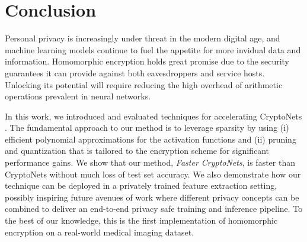 \documentclass[conference]{IEEEtran}
\begin{document}



\section{Conclusion}
Personal privacy is increasingly under threat in the modern digital age, and machine learning models continue to fuel the appetite for more invidual data and information. 
Homomorphic encryption holds great promise due to the security guarantees it can provide against both eavesdroppers and service hosts.
Unlocking its potential will require reducing the high overhead of arithmetic operations prevalent in neural networks.


In this work, we introduced and evaluated techniques for accelerating CryptoNets \cite{gilad2016cryptonets}.
The fundamental approach to our method is to leverage sparsity by using (i) efficient polynomial approximations for the activation functions and (ii) pruning and quantization that is tailored to the encryption scheme for significant performance gains. 
We show that our method, \textit{Faster CryptoNets}, is faster than CryptoNets without much loss of test set accuracy.%
We also demonstrate how our technique can be deployed in a privately trained feature extraction setting, possibly inspiring future avenues of work where different privacy concepts can be combined to deliver an end-to-end privacy safe training and inference pipeline.  To the best of our knowledge, this is the first implementation of homomorphic encryption on a real-world medical imaging dataset.  
\end{document}
